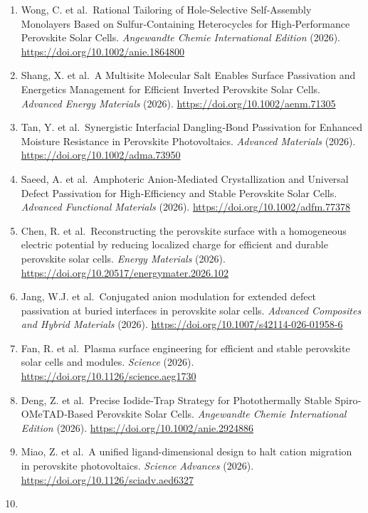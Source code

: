 \documentclass[
  11pt,
]{article}
\begin{document}
\begin{enumerate}
  performance. \emph{Hybrid Advances} (2026).
  \url{https://doi.org/10.1016/j.hybadv.2026.100721}
\item
  Wong, C. et al.~Rational Tailoring of Hole‐Selective Self‐Assembly
  Monolayers Based on Sulfur‐Containing Heterocycles for
  High‐Performance Perovskite Solar Cells. \emph{Angewandte Chemie
  International Edition} (2026).
  \url{https://doi.org/10.1002/anie.1864800}
\item
  Shang, X. et al.~A Multisite Molecular Salt Enables Surface
  Passivation and Energetics Management for Efficient Inverted
  Perovskite Solar Cells. \emph{Advanced Energy Materials} (2026).
  \url{https://doi.org/10.1002/aenm.71305}
\item
  Tan, Y. et al.~Synergistic Interfacial Dangling‐Bond Passivation for
  Enhanced Moisture Resistance in Perovskite Photovoltaics.
  \emph{Advanced Materials} (2026).
  \url{https://doi.org/10.1002/adma.73950}
\item
  Saeed, A. et al.~Amphoteric Anion‐Mediated Crystallization and
  Universal Defect Passivation for High‐Efficiency and Stable Perovskite
  Solar Cells. \emph{Advanced Functional Materials} (2026).
  \url{https://doi.org/10.1002/adfm.77378}
\item
  Chen, R. et al.~Reconstructing the perovskite surface with a
  homogeneous electric potential by reducing localized charge for
  efficient and durable perovskite solar cells. \emph{Energy Materials}
  (2026). \url{https://doi.org/10.20517/energymater.2026.102}
\item
  Jang, W.J. et al.~Conjugated anion modulation for extended defect
  passivation at buried interfaces in perovskite solar cells.
  \emph{Advanced Composites and Hybrid Materials} (2026).
  \url{https://doi.org/10.1007/s42114-026-01958-6}
\item
  Fan, R. et al.~Plasma surface engineering for efficient and stable
  perovskite solar cells and modules. \emph{Science} (2026).
  \url{https://doi.org/10.1126/science.aeg1730}
\item
  Deng, Z. et al.~Precise Iodide‐Trap Strategy for Photothermally Stable
  Spiro‐OMeTAD‐Based Perovskite Solar Cells. \emph{Angewandte Chemie
  International Edition} (2026).
  \url{https://doi.org/10.1002/anie.2924886}
\item
  Miao, Z. et al.~A unified ligand-dimensional design to halt cation
  migration in perovskite photovoltaics. \emph{Science Advances} (2026).
  \url{https://doi.org/10.1126/sciadv.aed6327}
\item

\end{enumerate}
\end{document}

